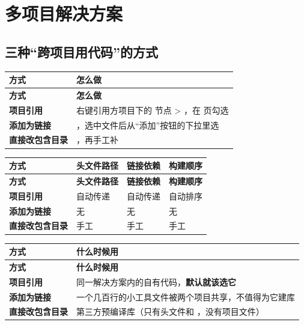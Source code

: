{\section{多项目解决方案}

\subsection{三种“跨项目用代码”的方式}

\begin{longtable}{L{2.8cm}L{12.0cm}}
\toprule
\textbf{方式} & \textbf{怎么做} \\
\midrule
\endfirsthead
\toprule
\textbf{方式} & \textbf{怎么做} \\
\midrule
\endhead
\bottomrule
\endlastfoot
\textbf{项目引用} & 右键引用方项目下的  节点 > ，在  页勾选 \\
\textbf{添加为链接} & ，选中文件后从“添加”按钮的下拉里选  \\
\textbf{直接改包含目录} & ，再手工补  \\
\end{longtable}

\begin{longtable}{L{3.4cm}L{3.4cm}L{3.4cm}L{3.4cm}}
\toprule
\textbf{方式} & \textbf{头文件路径} & \textbf{链接依赖} & \textbf{构建顺序} \\
\midrule
\endfirsthead
\toprule
\textbf{方式} & \textbf{头文件路径} & \textbf{链接依赖} & \textbf{构建顺序} \\
\midrule
\endhead
\bottomrule
\endlastfoot
\textbf{项目引用} & 自动传递 & 自动传递 & 自动排序 \\
\textbf{添加为链接} & 无 & 无 & 无 \\
\textbf{直接改包含目录} & 手工 & 手工 & 手工 \\
\end{longtable}

\begin{longtable}{L{2.8cm}L{12.0cm}}
\toprule
\textbf{方式} & \textbf{什么时候用} \\
\midrule
\endfirsthead
\toprule
\textbf{方式} & \textbf{什么时候用} \\
\midrule
\endhead
\bottomrule
\endlastfoot
\textbf{项目引用} & 同一解决方案内的自有代码，\textbf{默认就该选它} \\
\textbf{添加为链接} & 一个几百行的小工具文件被两个项目共享，不值得为它建库 \\
\textbf{直接改包含目录} & 第三方预编译库（只有头文件和 ，没有项目文件） \\
\end{longtable}

}
